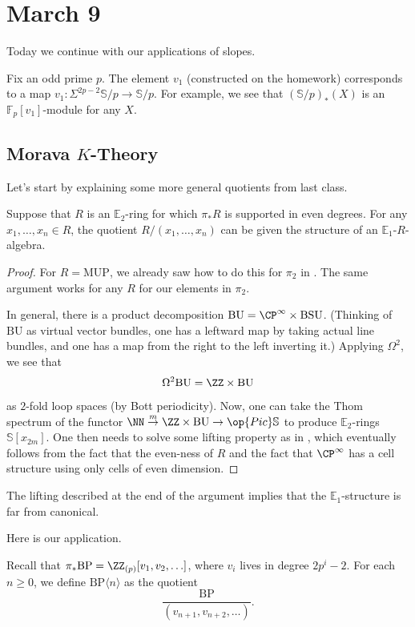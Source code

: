 \documentclass[../notes.tex]{subfiles}
\begin{document}
\section{March 9}
Today we continue with our applications of slopes.
\begin{remark}
	Fix an odd prime $p$. The element $v_1$ (constructed on the homework) corresponds to a map $v_1\colon\Sigma^{2p-2}\mathbb S/p\to\mathbb S/p$. For example, we see that $(\mathbb S/p)_*(X)$ is an $\mathbb F_p[v_1]$-module for any $X$.
\end{remark}

\subsection{Morava \texorpdfstring{$K$}{ K}-Theory}
Let's start by explaining some more general quotients from last class.
\begin{proposition}
	Suppose that $R$ is an $\mathbb E_2$-ring for which $\pi_*R$ is supported in even degrees. For any $x_1,\ldots,x_n\in R$, the quotient $R/(x_1,\ldots,x_n)$ can be given the structure of an $\mathbb E_1$-$R$-algebra.
\end{proposition}
\begin{proof}
	For $R=\mathrm{MUP}$, we already saw how to do this for $\pi_2$ in . The same argument works for any $R$ for our elements in $\pi_2$.

	In general, there is a product decomposition $\mathrm{BU}=\CP^\infty\times\mathrm{BSU}$. (Thinking of $\mathrm{BU}$ as virtual vector bundles, one has a leftward map by taking actual line bundles, and one has a map from the right to the left inverting it.) Applying $\Omega^2$, we see that
	\[\Omega^2\mathrm{BU}=\ZZ\times\mathrm{BU}\]
	as $2$-fold loop spaces (by Bott periodicity). Now, one can take the Thom spectrum of the functor $\NN\stackrel m\to\ZZ\times\mathrm{BU}\to\op{Pic}\mathbb S$ to produce $\mathbb E_2$-rings $\mathbb S[x_{2m}]$. One then needs to solve some lifting property as in , which eventually follows from the fact that the even-ness of $R$ and the fact that $\CP^\infty$ has a cell structure using only cells of even dimension.
\end{proof}
\begin{remark}
	The lifting described at the end of the argument implies that the $\mathbb E_1$-structure is far from canonical.
\end{remark}
Here is our application.
\begin{definition}
	Recall that $\pi_*\mathrm{BP}=\ZZ_{(p)}[v_1,v_2,\ldots]$, where $v_i$ lives in degree $2p^i-2$. For each $n\ge0$, we define $\mathrm{BP}\langle n\rangle$ as the quotient
	\[\frac{\mathrm{BP}}{(v_{n+1},v_{n+2},\ldots)}.\]
\end{definition}
\end{document}
